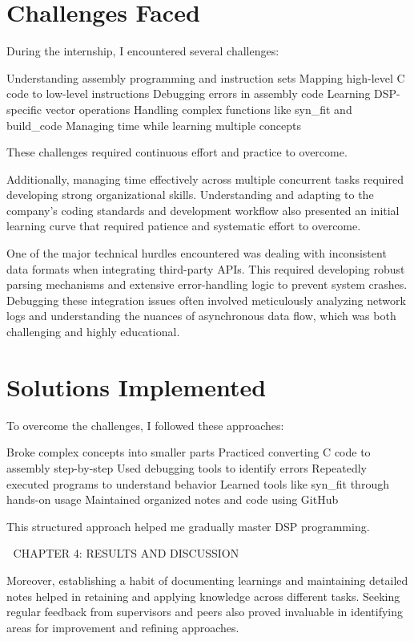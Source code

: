 \documentclass[12pt,a4paper]{report}
\begin{document}
\section{Challenges Faced}

During the internship, I encountered several challenges:


Understanding assembly programming and instruction sets Mapping high-level C code to low-level instructions Debugging errors in assembly code Learning DSP-specific vector operations Handling complex functions like syn\_fit and build\_code Managing time while learning multiple concepts


These challenges required continuous effort and practice to overcome.


Additionally, managing time effectively across multiple concurrent tasks required developing strong organizational skills. Understanding and adapting to the company's coding standards and development workflow also presented an initial learning curve that required patience and systematic effort to overcome.


One of the major technical hurdles encountered was dealing with inconsistent data formats when integrating third-party APIs. This required developing robust parsing mechanisms and extensive error-handling logic to prevent system crashes. Debugging these integration issues often involved meticulously analyzing network logs and understanding the nuances of asynchronous data flow, which was both challenging and highly educational.


\section{Solutions Implemented}

To overcome the challenges, I followed these approaches:


Broke complex concepts into smaller parts Practiced converting C code to assembly step-by-step Used debugging tools to identify errors Repeatedly executed programs to understand behavior Learned tools like syn\_fit through hands-on usage Maintained organized notes and code using GitHub


This structured approach helped me gradually master DSP programming.


🔷 CHAPTER 4: RESULTS AND DISCUSSION


Moreover, establishing a habit of documenting learnings and maintaining detailed notes helped in retaining and applying knowledge across different tasks. Seeking regular feedback from supervisors and peers also proved invaluable in identifying areas for improvement and refining approaches.
\end{document}

